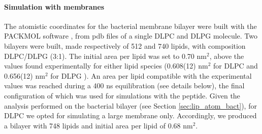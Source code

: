 

\paragraph{Simulation with membranes} The atomistic coordinates for the bacterial membrane bilayer were built with the PACKMOL software \citep{Martinez2009}, from pdb files of a single DLPC \citep{PogerOrig} and DLPG \citep{Kukol2009} molecule. Two bilayers were built, made respectively of 512 and 740 lipids, with composition DLPC/DLPG (3:1). The initial area per lipid was set to 0.70 nm$^2$, above the values found experimentally for either lipid species (0.608(12) nm$^2$ for DLPC \citep{Kucerka2011} and 0.656(12) nm$^2$ for DLPG \citep{Pan2012}). An area per lipid compatible with the experimental values was reached during a 400 ns equilibration (see details below), the final configuration of which was used for simulations with the peptide.
Given the analysis performed on the bacterial bilayer (see Section \ref{sec:lip_atom_bact}), for DLPC we opted for simulating a large membrane only. Accordingly, we produced a bilayer with 748 lipids and initial area per lipid of 0.68 nm$^2$.

